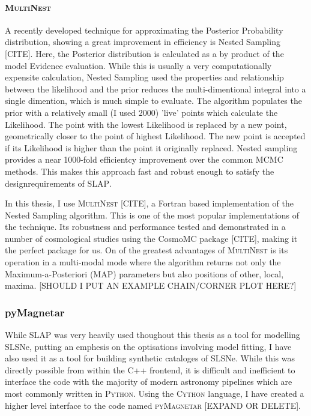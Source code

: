 \paragraph{\textsc{MultiNest}}
A recently developed technique for approximating the Posterior Probability distribution, showing a great improvement in efficiency is Nested Sampling [CITE]. Here, the Posterior distribution is calculated as a by product of the model Evidence evaluation. While this is usually a very computationally expensite calculation, Nested Sampling used the properties and relationship between the likelihood and the prior reduces the multi-dimentional integral into a single dimention, which is much simple to evaluate. The algorithm populates the prior with a relatively small (I used 2000) 'live' points which calculate the Likelihood. The point with the lowest Likelihood is replaced by a new point, geometrically closer to the point of highest Likelihood. The new point is accepted if its Likelihood is higher than the point it originally replaced. Nested sampling provides a near 1000-fold efficientcy improvement over the common MCMC methods. This makes this approach fast and robust enough to satisfy the designrequirements of \textsc{SLAP}.

In this thesis, I use \textsc{MultiNest} [CITE], a Fortran based implementation of the Nested Sampling algorithm. This is one of the most popular implementations of the technique. Its robustness and performance tested and demonstrated in a number of cosmological studies using the CosmoMC package [CITE], making it the perfect package for us. On of the greatest advantages of \textsc{MultiNest} is its operation in a multi-modal mode where the algorithm returns not only the Maximum-a-Posteriori (MAP) parameters but also positions of other, local, maxima. [SHOULD I PUT AN EXAMPLE CHAIN/CORNER PLOT HERE?]

\subsubsection{pyMagnetar}
While SLAP was very heavily used thoughout this thesis as a tool for modelling SLSNe, putting an emphesis on the optisations involving model fitting, I have also used it as a tool for building synthetic cataloges of SLSNe. While this was directly possible from within the C++ frontend, it is difficult and inefficient to interface the code with the majority of modern astronomy pipelines which are most commonly written in \textsc{Python}. Using the \textsc{Cython} language, I have created a higher level interface to the code named \textsc{pyMagnetar} [EXPAND OR DELETE].

